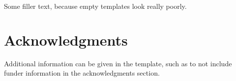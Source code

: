 \documentclass[9pt,lineno]{elife}
\begin{document}
Some filler text, because empty templates look really poorly. \lipsum[1]


\section{Acknowledgments}

Additional information can be given in the template, such as to not include funder information in the acknowledgments section.



\end{document}
